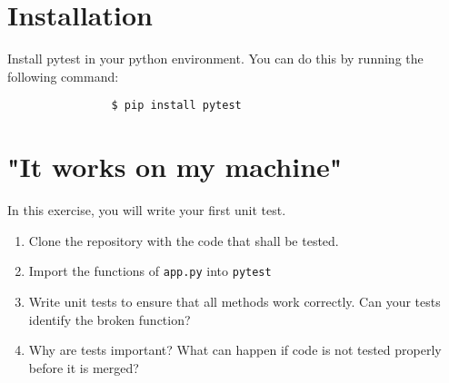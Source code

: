 \documentclass[english]{sheet}
\subtitle{Testing\textemdash{}PyTest}
\begin{document}
\maketitle

\section{Installation}
 Install pytest in your python environment. You can do this by running the following command:

            \begin{verbatim}
                $ pip install pytest
            \end{verbatim}

\section{"It works on my machine"}

\begin{exercise}
In this exercise, you will write your first unit test.
    \begin{enumerate}
        \item Clone the repository with the code that shall be tested.
	\item Import the functions of \texttt{app.py} into \texttt{pytest}
        \item Write unit tests to ensure that all methods work correctly. Can your tests identify the broken function?
        \item Why are tests important? What can happen if code is not tested properly before it is merged?
    \end{enumerate}
\end{exercise}
\end{document}
